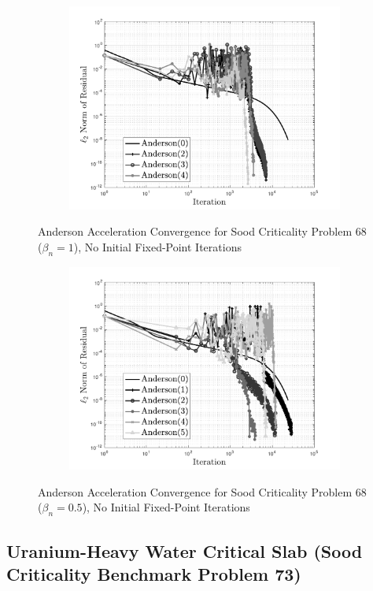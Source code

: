 \begin{figure}[!htbp]
\centering
\begin{subfigure}{\textwidth}
  \centering
  \includegraphics[width=.73\linewidth]{Figures/AndersonAcceleration/SoodProb68_FPI1}
\end{subfigure}
\caption{Anderson Acceleration Convergence for Sood Criticality Problem 68 ($\beta_{n} = 1$), No Initial Fixed-Point Iterations}
\label{fig:AASoodProb68}
\end{figure}

\begin{figure}[!htbp]
\centering
\begin{subfigure}{\textwidth}
  \centering
  \includegraphics[width=.73\linewidth]{Figures/AndersonAcceleration/SoodProb68_FPI1_HalfBeta}
\end{subfigure}
\caption{Anderson Acceleration Convergence for Sood Criticality Problem 68 ($\beta_{n} = 0.5$), No Initial Fixed-Point Iterations}
\label{fig:AASoodProb68HalfBeta}
\end{figure}

\clearpage

\subsection{Uranium-Heavy Water Critical Slab (Sood Criticality Benchmark Problem 73)}

